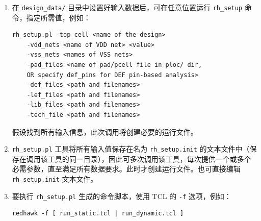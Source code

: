 \begin{enumerate}
\begin{itemize}
    \item \texttt{-sta\_files}——若所需文件在 \texttt{timing/} 目录中则可选。指定来自 STA 的时序文件，见第~\ref{chap:ate}~章。签核分析运行需要
    \item \texttt{-spf\_files}——若所需文件在 \texttt{spf/} 目录中则可选。指定布局后寄生的层次 SPEF 或 DSPF 文件
    \item \texttt{-apl\_files}——包含 APL 表征电流剖面的 RedHawk \texttt{cell.current} 文件。模式为 \texttt{sign\_off} 且分析类型为 \texttt{dynamic} 或 \texttt{lowpower} 时必需
    \item \texttt{-aplcap\_files}——来自 APL 表征的 RedHawk \texttt{cell.cdev} 器件电容文件。模式为 \texttt{sign\_off} 且分析类型为 \texttt{dynamic} 或 \texttt{lowpower} 时必需
    \item \texttt{-aplpwcap\_files}——来自 APL 上电表征的 RedHawk \texttt{cell.pwcap} PWL decap 文件。模式为 \texttt{sign\_off} 且分析类型为 \texttt{lowpower} 时必需
    \item \texttt{-gds\_dirs}——若所需文件在 \texttt{gds2def/}、\texttt{gds2rh/} 目录中则可选。指定 \texttt{gds2def} 或 \texttt{gds2rh} 在指定目录中创建的所有 LEF、DEF 与 PRATIO 文件
    \item \texttt{-toggle}（可选）——自动化流程分配默认值
    \item \texttt{-input\_transition}（可选）——自动化流程分配默认值
  \end{itemize}

  \begin{noteBox}
  可缩写命令选项，只要无歧义即可。例如，可用 \texttt{-top} 作为 \texttt{-top\_cell} 的缩写。
  \end{noteBox}

  \item 在 \texttt{design\_data/} 目录中设置好输入数据后，可在任意位置运行 \texttt{rh\_setup} 命令，指定所需值，例如：
\begin{lstlisting}
rh_setup.pl -top_cell <name of the design>
    -vdd_nets <name of VDD net> <value>
    -vss_nets <names of VSS nets>
    -pad_files <name of pad/pcell file in ploc/ dir,
    OR specify def_pins for DEF pin-based analysis>
    -def_files <path and filenames>
    -lef_files <path and filenames>
    -lib_files <path and filenames>
    -tech_file <path and filenames>
\end{lstlisting}
  假设找到所有输入信息，此次调用将创建必要的运行文件。

  \item \texttt{rh\_setup.pl} 工具将所有输入值保存在名为 \texttt{rh\_setup.init} 的文本文件中（保存在调用该工具的同一目录），因此可多次调用该工具，每次提供一个或多个必需参数，直至满足所有数据要求。此时才创建运行文件。也可直接编辑 \texttt{rh\_setup.init} 文本文件。

  \item 要执行 \texttt{rh\_setup.pl} 生成的命令脚本，使用 TCL 的 \texttt{-f} 选项，例如：
\begin{lstlisting}
redhawk -f [ run_static.tcl | run_dynamic.tcl ]
\end{lstlisting}
\end{enumerate}

